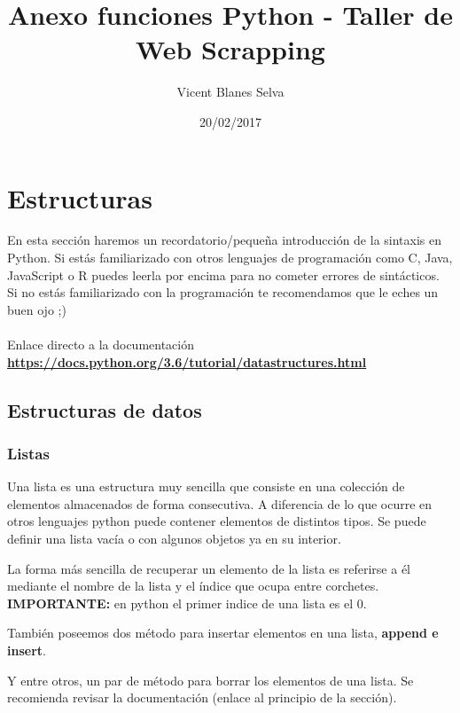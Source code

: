 \documentclass{article}
\title{Anexo funciones Python - Taller de Web Scrapping}
\date{20/02/2017}
\author{Vicent Blanes Selva}
\begin{document}
\maketitle
\newpage
\tableofcontents
\newpage
\section{Estructuras}
\justify
En esta sección haremos un recordatorio/pequeña introducción de la sintaxis 
en Python. Si estás familiarizado con otros lenguajes de programación como C, Java, JavaScript o R 
puedes leerla por encima para no cometer errores de sintácticos. Si no estás familiarizado con la programación
te recomendamos que le eches un buen ojo ;)\\\\
Enlace directo a la documentación \textbf{\url{https://docs.python.org/3.6/tutorial/datastructures.html}}
	\subsection{Estructuras de datos}
		\subsubsection{Listas}
			\justify
			Una lista es una estructura muy sencilla que consiste en una colección
			de elementos almacenados de forma consecutiva. A diferencia de lo que ocurre en otros lenguajes
			python puede contener elementos de distintos tipos. Se puede definir una lista vacía o 
			con algunos objetos ya en su interior. 
			
			\justify
			La forma más sencilla de recuperar un elemento de la lista es referirse a él mediante
			el nombre de la lista y el índice que ocupa entre corchetes. \textbf{IMPORTANTE:} en python 
			el primer indice de una lista es el 0.
			
			\justify
			También poseemos dos método para insertar elementos en una lista, \textbf{append e insert}.
			
			\justify
			Y entre otros, un par de método para borrar los elementos de una lista. Se recomienda
			revisar la documentación (enlace al principio de la sección).
			
\end{document}
